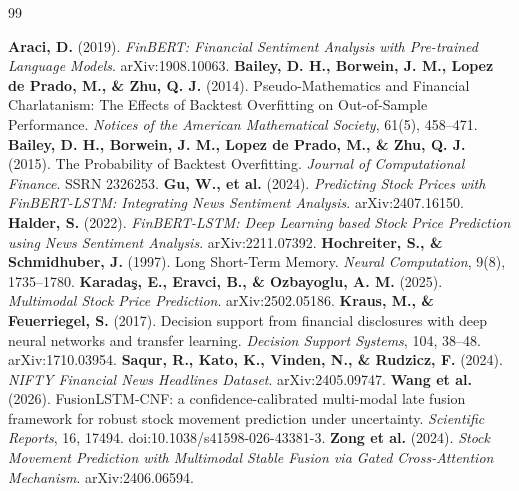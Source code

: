 \begin{thebibliography}{99}
 \textbf{Araci, D.} (2019). \emph{FinBERT: Financial Sentiment Analysis with Pre-trained Language Models}. arXiv:1908.10063.
 \textbf{Bailey, D. H., Borwein, J. M., Lopez de Prado, M., \& Zhu, Q. J.} (2014). Pseudo-Mathematics and Financial Charlatanism: The Effects of Backtest Overfitting on Out-of-Sample Performance. \emph{Notices of the American Mathematical Society}, 61(5), 458--471.
 \textbf{Bailey, D. H., Borwein, J. M., Lopez de Prado, M., \& Zhu, Q. J.} (2015). The Probability of Backtest Overfitting. \emph{Journal of Computational Finance}. SSRN 2326253.
 \textbf{Gu, W., et al.} (2024). \emph{Predicting Stock Prices with FinBERT-LSTM: Integrating News Sentiment Analysis}. arXiv:2407.16150.
 \textbf{Halder, S.} (2022). \emph{FinBERT-LSTM: Deep Learning based Stock Price Prediction using News Sentiment Analysis}. arXiv:2211.07392.
 \textbf{Hochreiter, S., \& Schmidhuber, J.} (1997). Long Short-Term Memory. \emph{Neural Computation}, 9(8), 1735--1780.
 \textbf{Karada\c{s}, E., Eravci, B., \& Ozbayoglu, A. M.} (2025). \emph{Multimodal Stock Price Prediction}. arXiv:2502.05186.
 \textbf{Kraus, M., \& Feuerriegel, S.} (2017). Decision support from financial disclosures with deep neural networks and transfer learning. \emph{Decision Support Systems}, 104, 38--48. arXiv:1710.03954.
 \textbf{Saqur, R., Kato, K., Vinden, N., \& Rudzicz, F.} (2024). \emph{NIFTY Financial News Headlines Dataset}. arXiv:2405.09747.
 \textbf{Wang et al.} (2026). FusionLSTM-CNF: a confidence-calibrated multi-modal late fusion framework for robust stock movement prediction under uncertainty. \emph{Scientific Reports}, 16, 17494. doi:10.1038/s41598-026-43381-3.
 \textbf{Zong et al.} (2024). \emph{Stock Movement Prediction with Multimodal Stable Fusion via Gated Cross-Attention Mechanism}. arXiv:2406.06594.
\end{thebibliography}
